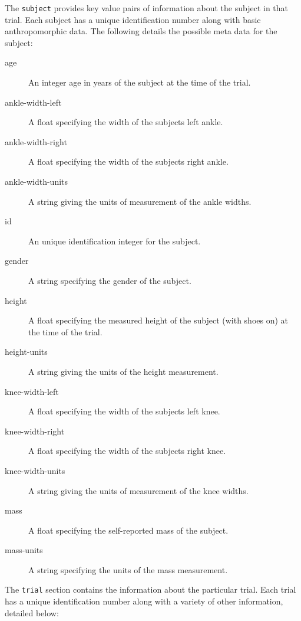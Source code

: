 \documentclass[fleqn,10pt]{wlpeerj}
\begin{document}
The \verb+subject+ provides key value pairs of information about the subject in
that trial. Each subject has a unique identification number along with basic
anthropomorphic data. The following details the possible meta data for the
subject:

\begin{description}
  \item[age] An integer age in years of the subject at the time of the trial.
  \item[ankle-width-left] A float specifying the width of the subjects left
    ankle.
  \item[ankle-width-right] A float specifying the width of the subjects right
    ankle.
  \item[ankle-width-units] A string giving the units of measurement of the
    ankle widths.
  \item[id] An unique identification integer for the subject.
  \item[gender] A string specifying the gender of the subject.
  \item[height] A float specifying the measured height of the subject (with
    shoes on) at the time of the trial.
  \item[height-units] A string giving the units of the height measurement.
  \item[knee-width-left] A float specifying the width of the subjects left
    knee.
  \item[knee-width-right] A float specifying the width of the subjects right
    knee.
  \item[knee-width-units] A string giving the units of measurement of the
    knee widths.
  \item[mass] A float specifying the self-reported mass of the subject.
  \item[mass-units] A string specifying the units of the mass measurement.
\end{description}

The \verb+trial+ section contains the information about the particular trial.
Each trial has a unique identification number along with a variety of other
information, detailed below:
\end{document}
